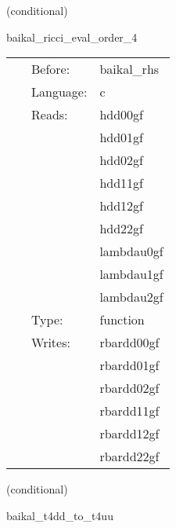 \vspace{5mm}

   (conditional) 

\hspace{5mm} baikal\_ricci\_eval\_order\_4 

\hspace{5mm}{\it compute ricci tensor, needed for bssn rhss, at finite-differencing order 4 } 


\hspace{5mm}

 \begin{tabular*}{160mm}{cll} 
~ & Before:  & baikal\_rhs \\ 
~ & Language:  & c \\ 
~ & Reads:  & hdd00gf \\ 
~& ~ &hdd01gf\\ 
~& ~ &hdd02gf\\ 
~& ~ &hdd11gf\\ 
~& ~ &hdd12gf\\ 
~& ~ &hdd22gf\\ 
~& ~ &lambdau0gf\\ 
~& ~ &lambdau1gf\\ 
~& ~ &lambdau2gf\\ 
~ & Type:  & function \\ 
~ & Writes:  & rbardd00gf \\ 
~& ~ &rbardd01gf\\ 
~& ~ &rbardd02gf\\ 
~& ~ &rbardd11gf\\ 
~& ~ &rbardd12gf\\ 
~& ~ &rbardd22gf\\ 
\end{tabular*} 


\vspace{5mm}

   (conditional) 

\hspace{5mm} baikal\_t4dd\_to\_t4uu 

\hspace{5mm}{\it compute t4uu from t4dd (provided in et?? from tmunubase), needed for bssn rhss } 


\hspace{5mm}

